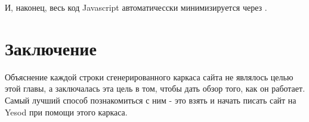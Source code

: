 И, наконец, весь код Javascript автоматичесски минимизируется через .

\section{Заключение}

Объяснение каждой строки сгенерированного каркаса сайта не являлось целью этой главы, а заключалась эта цель в том, чтобы дать обзор того, как он работает. Самый лучший способ познакомиться с ним - это взять и начать писать сайт на Yesod при помощи этого каркаса.
